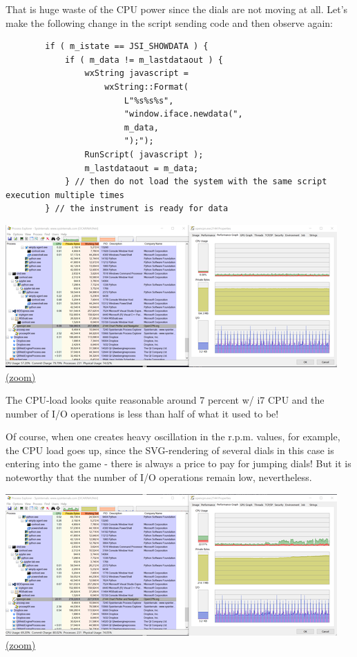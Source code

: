 \documentclass[11pt]{article}
\begin{document}
    That is huge waste of the CPU power since the dials are not moving at
all. Let's make the following change in the script sending code and then
observe again:

\begin{verbatim}
        if ( m_istate == JSI_SHOWDATA ) {
            if ( m_data != m_lastdataout ) {
                wxString javascript =
                    wxString::Format(
                        L"%s%s%s",
                        "window.iface.newdata(",
                        m_data,
                        ");");
                RunScript( javascript );
                m_lastdataout = m_data;
            } // then do not load the system with the same script execution multiple times
        } // the instrument is ready for data
\end{verbatim}

    \includegraphics{2020-01-20_dgb_procexp_12_instrucjs_clients_alpha_02.png}
\href{img/2020-01-20_dgb_procexp_12_instrucjs_clients_alpha_02.png}{(zoom)}

    The CPU-load looks quite reasonable around 7 percent w/ i7 CPU and the
number of I/O operations is less than half of what it used to be!

    Of course, when one creates heavy oscillation in the r.p.m. values, for
example, the CPU load goes up, since the SVG-rendering of several dials
in this case is entering into the game - there is always a price to pay
for jumping dials! But it is noteworthy that the number of I/O
operations remain low, nevertheless.

    \includegraphics{2020-01-20_dgb_procexp_12_instrucjs_clients_alpha_02_cont_changes.png}
\href{img/2020-01-20_dgb_procexp_12_instrucjs_clients_alpha_02_cont_changes.png}{(zoom)}
\end{document}
